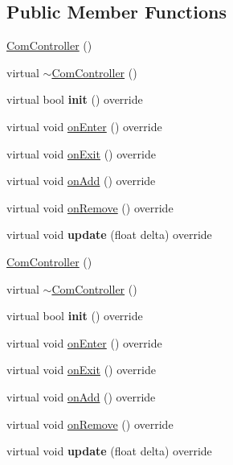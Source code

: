 \subsection*{Public Member Functions}
\begin{DoxyCompactItemize}
\item 
\hyperlink{classcocostudio_1_1ComController_a7ab7a1d39f1ca8cc381665b133843a47}{Com\+Controller} ()
\item 
virtual \hyperlink{classcocostudio_1_1ComController_ab92aeadfa66c0f3badb54e90f8c01e14}{$\sim$\+Com\+Controller} ()
\item 
\mbox{\label{classcocostudio_1_1ComController_a3769ac14e59f1ba3626bdb836502ac00}} 
virtual bool {\bfseries init} () override
\item 
virtual void \hyperlink{classcocostudio_1_1ComController_a174f77b9007668906efdaa7e17274945}{on\+Enter} () override
\item 
virtual void \hyperlink{classcocostudio_1_1ComController_a5f6942f0118c859707f9703967b05033}{on\+Exit} () override
\item 
virtual void \hyperlink{classcocostudio_1_1ComController_aa1826f9b8fdc5c04a5bba8be06cd9ff9}{on\+Add} () override
\item 
virtual void \hyperlink{classcocostudio_1_1ComController_aa692fc6d0c38dd5ab8afeefb0db70fd7}{on\+Remove} () override
\item 
\mbox{\label{classcocostudio_1_1ComController_a2336a24b47c887ed6fc1f5d5f928a12f}} 
virtual void {\bfseries update} (float delta) override
\item 
\hyperlink{classcocostudio_1_1ComController_a7ab7a1d39f1ca8cc381665b133843a47}{Com\+Controller} ()
\item 
virtual \hyperlink{classcocostudio_1_1ComController_a2e02b067a07f7380733fad80ed674b59}{$\sim$\+Com\+Controller} ()
\item 
\mbox{\label{classcocostudio_1_1ComController_a37f4bd98f4ad9bd80a6b7f36aafee177}} 
virtual bool {\bfseries init} () override
\item 
virtual void \hyperlink{classcocostudio_1_1ComController_aaff7b67cb82e78b4678a051004b63071}{on\+Enter} () override
\item 
virtual void \hyperlink{classcocostudio_1_1ComController_aa13b0a65d6d8790feafe440b50c84c3b}{on\+Exit} () override
\item 
virtual void \hyperlink{classcocostudio_1_1ComController_a16a158626f3b11e1a7aadf1b742b742b}{on\+Add} () override
\item 
virtual void \hyperlink{classcocostudio_1_1ComController_a5f2401fae7582c7681d6883ff595caef}{on\+Remove} () override
\item 
\mbox{\label{classcocostudio_1_1ComController_a9ce1393a074a28c835922151109ac6b9}} 
virtual void {\bfseries update} (float delta) override
\end{DoxyCompactItemize}
